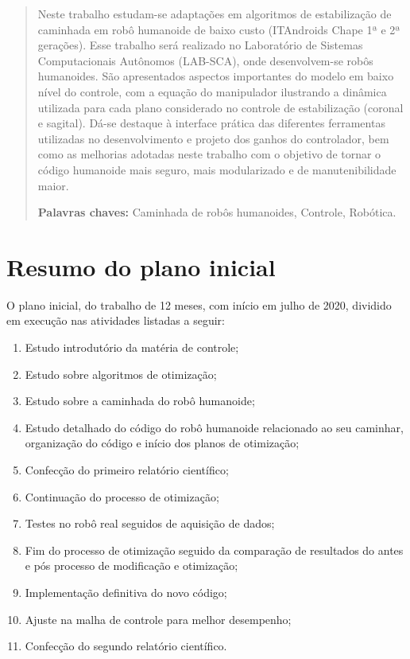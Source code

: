 \maketitle
\thispagestyle{empty}
\begin{abstract}
Neste trabalho estudam-se adaptações em algoritmos de estabilização de caminhada em robô humanoide de baixo custo (ITAndroids Chape 1ª e 2ª gerações). Esse trabalho será realizado no  Laboratório de Sistemas Computacionais Autônomos (LAB-SCA), onde desenvolvem-se robôs humanoides. São apresentados aspectos importantes do modelo em baixo nível do controle, com a equação do manipulador ilustrando a dinâmica utilizada para cada plano considerado no controle de estabilização (coronal e sagital). Dá-se destaque à interface prática das diferentes ferramentas utilizadas no desenvolvimento e projeto dos ganhos do controlador, bem como as melhorias adotadas neste trabalho com o objetivo de tornar o código humanoide mais seguro, mais modularizado e de manutenibilidade maior. 

\noindent \textbf{Palavras chaves:} Caminhada de robôs humanoides, Controle, Robótica.


\end{abstract}
\newpage

\tableofcontents

\newpage
\doublespacing
\section{Resumo do plano inicial}\label{sec:plano}

O plano inicial, do trabalho de 12 meses, com início em julho de 2020, dividido em execução nas atividades listadas a seguir:
\begin{enumerate}[A]
\item{Estudo introdutório da matéria de controle;}
\item{Estudo sobre algoritmos de otimização;}
\item{Estudo sobre a caminhada do robô humanoide;}
\item{Estudo detalhado do código do robô humanoide relacionado ao seu caminhar, organização do código e início dos planos de otimização;}
\item{Confecção do primeiro relatório científico;}
\item{Continuação do processo de otimização;}
\item{Testes no robô real seguidos de aquisição de dados;}
\item{Fim do processo de otimização seguido da comparação de resultados do antes e pós processo de modificação e otimização;}
\item{Implementação definitiva do novo código;}
\item{Ajuste na malha de controle para melhor desempenho;}
\item{Confecção do segundo relatório científico.}
\end{enumerate}

